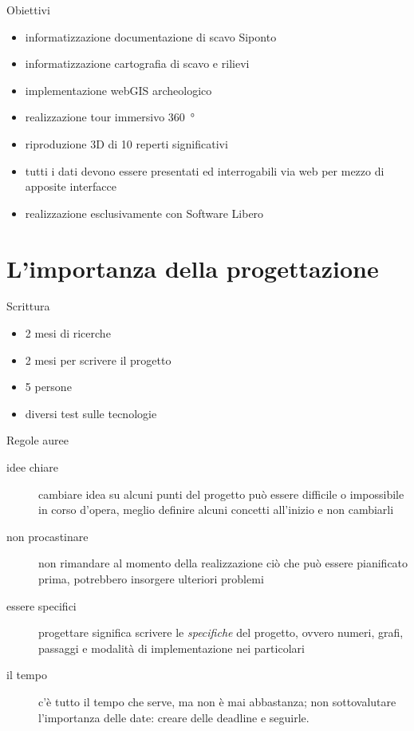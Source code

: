 \documentclass{beamer}
\begin{document}
		\begin{frame}{Obiettivi}
			\begin{itemize}
				\item informatizzazione documentazione di scavo Siponto
				\item informatizzazione cartografia di scavo e rilievi
				\item implementazione webGIS archeologico
				\item realizzazione tour immersivo \SI{360}{\degree}
				\item riproduzione 3D di 10 reperti significativi
				\item tutti i dati devono essere presentati ed interrogabili via web per mezzo di apposite interfacce
				\item realizzazione esclusivamente con Software Libero
			\end{itemize}
		\end{frame}

	\section{L'importanza della progettazione}
		
		\begin{frame}{Scrittura}
			\begin{itemize}
				\item 2 mesi di ricerche
				\item 2 mesi per scrivere il progetto
				\item 5 persone
				\item diversi test sulle tecnologie
			\end{itemize}
		\end{frame}

		\begin{frame}{Regole auree}
			\begin{description}
				\item[idee chiare] cambiare idea su alcuni punti del progetto può essere difficile o impossibile in corso d'opera, meglio definire alcuni concetti all'inizio e non cambiarli
				\item[non procastinare] non rimandare al momento della realizzazione ciò che può essere pianificato prima, potrebbero insorgere ulteriori problemi
				\item[essere specifici] progettare significa scrivere le \emph{specifiche} del progetto, ovvero numeri, grafi, passaggi e modalità di implementazione nei particolari
				\item[il tempo] c'è tutto il tempo che serve, ma non è mai abbastanza; non sottovalutare l'importanza delle date: creare delle deadline e seguirle.
			\end{description}
		\end{frame}
\end{document}
